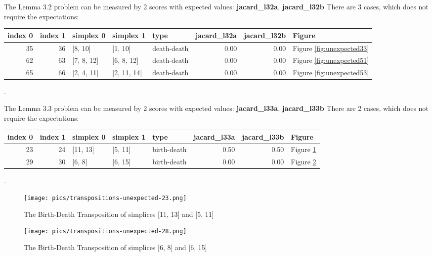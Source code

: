 \documentclass{article}
\begin{document}
    \par The Lemma 3.2 problem can be measured by 2 scores with expected 
    values: \textbf{jacard\_l32a}, \textbf{jacard\_l32b}
    There are 3 cases, which does not require the expectations: 
\begin{center}
\begin{tabular}{rrlllrrl}
\toprule
index 0 & index 1 & simplex 0 & simplex 1 & type & jacard\_l32a & jacard\_l32b & Figure \\
\midrule
35 & 36 & [8, 10] & [1, 10] & death-death & 0.00 & 0.00 & Figure \ref{fig:unexpected33} \\
62 & 63 & [7, 8, 12] & [6, 8, 12] & death-death & 0.00 & 0.00 & Figure \ref{fig:unexpected51} \\
65 & 66 & [2, 4, 11] & [2, 11, 14] & death-death & 0.00 & 0.00 & Figure \ref{fig:unexpected53} \\
\bottomrule
\end{tabular}
\end{center}.
    
    \par The Lemma 3.3 problem can be measured by 2 scores with expected 
    values: \textbf{jacard\_l33a}, \textbf{jacard\_l33b}
    There are 2 cases, which does not require the expectations: 
\begin{center}
\begin{tabular}{rrlllrrl}
\toprule
index 0 & index 1 & simplex 0 & simplex 1 & type & jacard\_l33a & jacard\_l33b & Figure \\
\midrule
23 & 24 & [11, 13] & [5, 11] & birth-death & 0.50 & 0.50 & Figure \ref{fig:unexpected23} \\
29 & 30 & [6, 8] & [6, 15] & birth-death & 0.00 & 0.00 & Figure \ref{fig:unexpected28} \\
\bottomrule
\end{tabular}
\end{center}.
    
    \begin{figure}[ht]
    \centering
    \texttt{[image: pics/transpositions-unexpected-23.png]}
    \label{fig:unexpected23}
    \caption{The Birth-Death Transposition of simplices [11, 13] and [5, 11]}
    \end{figure}
    
    \begin{figure}[ht]
    \centering
    \texttt{[image: pics/transpositions-unexpected-28.png]}
    \label{fig:unexpected28}
    \caption{The Birth-Death Transposition of simplices [6, 8] and [6, 15]}
    \end{figure}
    
\end{document}
